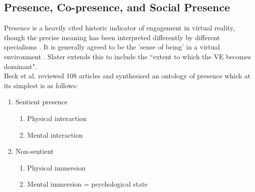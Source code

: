         \subsection{Presence, Co-presence, and Social Presence}
            Presence is a heavily cited historic indicator of engagement in virtual reality, though the precise meaning has been interpreted differently by different specialisms \cite{Beck2011, Schuemie2001}. It is generally agreed to be the 'sense of being' in a virtual environment \cite{Slater1999}. Slater extends this to include the ``extent to which the VE becomes dominant". \\
Beck et al. reviewed 108 articles and synthesised an ontology of presence \cite{Beck2011} which at its simplest is as follows:
            \begin{enumerate}
				\item Sentient presence
                    \begin{enumerate}
                     \item Physical interaction
                      \item Mental interaction
                    \end{enumerate}
                   \item Non-sentient
                   \begin{enumerate}
                       \item Physical immersion
                       \item Mental immersion = psychological state
                     \end{enumerate}
            \end{enumerate}
            

